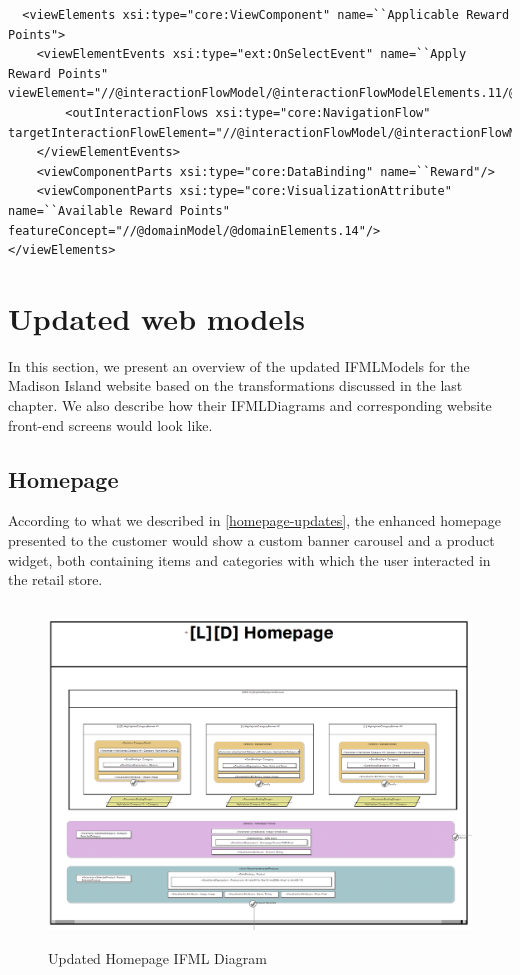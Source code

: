 \vspace{0.5cm}
\lstset{language=XML}
\begin{lstlisting} 
  <viewElements xsi:type="core:ViewComponent" name=``Applicable Reward Points">
    <viewElementEvents xsi:type="ext:OnSelectEvent" name=``Apply Reward Points" viewElement="//@interactionFlowModel/@interactionFlowModelElements.11/@viewElements.2/@viewElements.3">
        <outInteractionFlows xsi:type="core:NavigationFlow" targetInteractionFlowElement="//@interactionFlowModel/@interactionFlowModelElements.18/@actionEvents.0"/>
    </viewElementEvents>
    <viewComponentParts xsi:type="core:DataBinding" name=``Reward"/>
    <viewComponentParts xsi:type="core:VisualizationAttribute"  name=``Available Reward Points" featureConcept="//@domainModel/@domainElements.14"/>
</viewElements>
\end{lstlisting}
\vspace{0.5cm}

\newpage
\section{Updated web models}

In this section, we present an overview of the updated IFMLModels for the Madison Island website based on the transformations discussed in the last chapter. We also describe how their IFMLDiagrams and corresponding website front-end screens would look like.

\subsection{Homepage}

According to what we described in \ref{homepage-updates}, the enhanced homepage presented to the customer would show a custom banner carousel and a product widget, both containing items and categories with which the user interacted in the retail store.

\vspace{0.5cm}
\begin{figure}[H]
  \centering
    \includegraphics[height=9cm]{images/diagrams/after/ifml-homepage.png}
  \caption{Updated Homepage IFML Diagram}
  \label{fig:ifml-after-homepage}
\end{figure}

